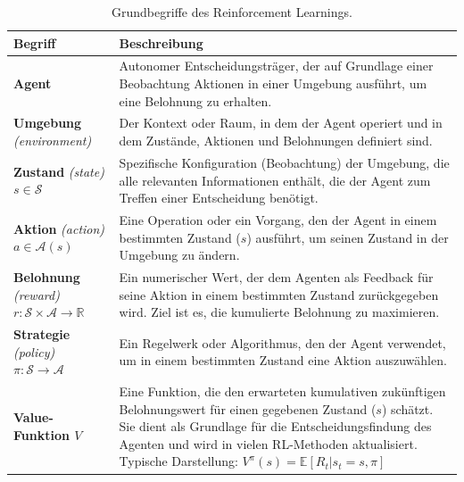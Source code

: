 \documentclass{solutionclass}
\begin{document}
\begin{table}[h!]
    \centering
    \caption{Grundbegriffe des Reinforcement Learnings.}
    \label{tab:RL_basic_terms}
    \begin{tabular}{|p{2.4cm}|p{11cm}|} %
        \hline
        \textcolor{DTUGreen}{\textbf{Begriff}} & \textcolor{DTUGreen}{\textbf{Beschreibung}} \\
        \hline
        \hline
        \textbf{Agent} & Autonomer Entscheidungsträger, der auf Grundlage einer Beobachtung Aktionen in einer Umgebung ausführt, um eine Belohnung zu erhalten. \\
        \hline
        \textbf{Umgebung} \newline \textit{(environment)} & Der Kontext oder Raum, in dem der Agent operiert und in dem Zustände, Aktionen und Belohnungen definiert sind. \\
        \hline
        \textbf{Zustand} \newline \textit{(state) \newline \(s \in \mathcal{S}\)} & Spezifische Konfiguration (Beobachtung) der Umgebung, die alle relevanten Informationen enthält, die der Agent zum Treffen einer Entscheidung benötigt. \\
        \hline
        \textbf{Aktion} \newline  \textit{(action) \newline \(a \in \mathcal{A}(s)\)} & Eine Operation oder ein Vorgang, den der Agent in einem bestimmten Zustand (\(s\)) ausführt, um seinen Zustand in der Umgebung zu ändern. \\
        \hline
        \textbf{Belohnung} \newline \textit{(reward) \newline \(r: \mathcal{S} \times \mathcal{A} \rightarrow \mathbb{R}\)} & Ein numerischer Wert, der dem Agenten als Feedback für seine Aktion in einem bestimmten Zustand zurückgegeben wird. Ziel ist es, die kumulierte Belohnung zu maximieren. \\
        \hline
        \textbf{Strategie} \newline \textit{(policy) \newline \( \pi: \mathcal{S} \rightarrow \mathcal{A} \)} & Ein Regelwerk oder Algorithmus, den der Agent verwendet, um in einem bestimmten Zustand eine Aktion auszuwählen. \\
        \hline
        \textbf{Value-Funktion $V$} & Eine Funktion, die den erwarteten kumulativen zukünftigen Belohnungswert für einen gegebenen Zustand (\(s\)) schätzt. Sie dient als Grundlage für die Entscheidungsfindung des Agenten und wird in vielen RL-Methoden aktualisiert. \newline Typische Darstellung: $V^\pi(s) = \mathbb{E}[R_t | s_t = s, \pi]$ \\

\end{tabular}
\end{table}
\end{document}

